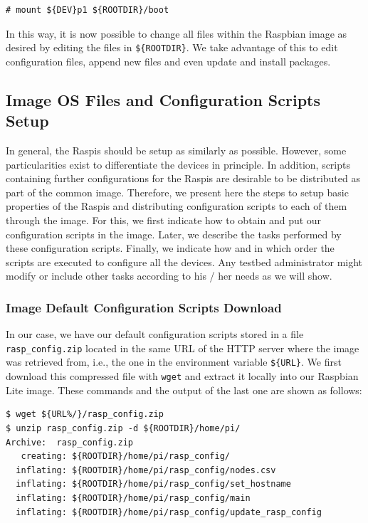 \documentclass[electronics,article,accept,moreauthors,pdftex,10pt,a4paper]{mdpi}
\theoremstyle{mdpi}
\newcounter{ex}
\newcounter{re}
\theoremstyle{mdpidefinition}
\begin{document}
\begin{lstlisting}[]
# mount ${DEV}p1 ${ROOTDIR}/boot
\end{lstlisting}
\FloatBarrier
\vspace{-5mm}

In this way, it is now possible to change all files within the Raspbian
image as desired by editing the files in \texttt{\$\{ROOTDIR\}}. We take
advantage of this to edit configuration files, append new files and even
update and install packages.

\subsection{Image OS Files and Configuration Scripts Setup}
In general, the Raspis should be setup as similarly as possible. However,
some particularities exist to differentiate the devices in principle. In addition,
scripts containing further configurations for the Raspis are desirable
to be distributed as part of the common image. Therefore, we present here
the steps to setup basic properties of the Raspis and distributing
configuration scripts to each of them through the image. For this, we first
indicate how to obtain and put our configuration scripts in the image. Later,
we describe the tasks performed by these configuration scripts. Finally, we
indicate how and in which order the scripts are executed to configure all the
devices. Any testbed administrator might modify or include other
tasks according to his / her needs as we will show.

\subsubsection{Image Default Configuration Scripts Download}
\label{sec:configuration_files_download}
In our case, we have our default configuration scripts stored in a
file \texttt{rasp\_config.zip} located in the same URL of the
HTTP server where the image was retrieved from, i.e., the one in
the environment variable \texttt{\$\{URL\}}. We first download
this compressed file with \texttt{wget} and extract it locally into our
Raspbian Lite image. These commands and the output of the last one are
shown as follows:

\begin{lstlisting}[]
$ wget ${URL%/}/rasp_config.zip
$ unzip rasp_config.zip -d ${ROOTDIR}/home/pi/
Archive:  rasp_config.zip
   creating: ${ROOTDIR}/home/pi/rasp_config/
  inflating: ${ROOTDIR}/home/pi/rasp_config/nodes.csv
  inflating: ${ROOTDIR}/home/pi/rasp_config/set_hostname
  inflating: ${ROOTDIR}/home/pi/rasp_config/main
  inflating: ${ROOTDIR}/home/pi/rasp_config/update_rasp_config
\end{lstlisting}
\FloatBarrier
\vspace{-5mm}
\end{document}
